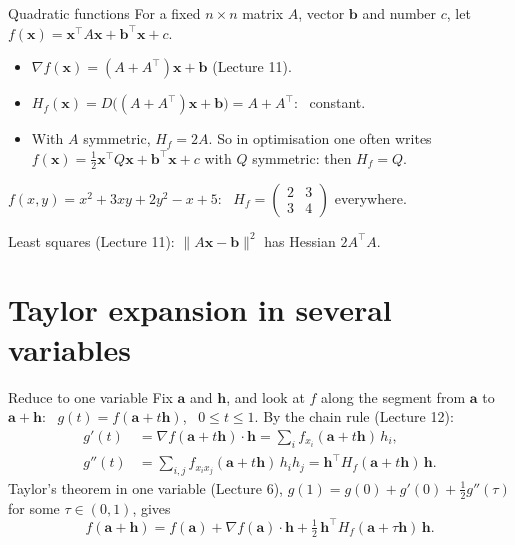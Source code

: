 \documentclass[10pt]{wosm-slides}
\newcommand{\norm}[1]{\lVert #1 \rVert}
\newcommand{\vx}{\mathbf{x}}
\newcommand{\va}{\mathbf{a}}
\newcommand{\vb}{\mathbf{b}}
\newcommand{\vh}{\mathbf{h}}
\begin{document}
\begin{frame}{Quadratic functions}
  For a fixed $n \times n$ matrix $A$, vector $\vb$ and number $c$, let
  $f(\vx) = \vx^\top A \vx + \vb^\top \vx + c$.
  \pause
  \begin{itemize}
    \item $\nabla f(\vx) = (A + A^\top)\vx + \vb$ \quad (Lecture 11).
    \item $H_f(\vx) = D\bigl((A + A^\top)\vx + \vb\bigr) = A + A^\top$: \ constant.
    \item With $A$ symmetric, $H_f = 2A$. So in optimisation one often writes
      $f(\vx) = \frac12 \vx^\top Q \vx + \vb^\top \vx + c$ with $Q$ symmetric: then $H_f = Q$.
  \end{itemize}
  \pause
  \begin{example}
    $f(x, y) = x^2 + 3xy + 2y^2 - x + 5$: \
    $H_f = \begin{pmatrix} 2 & 3 \\ 3 & 4 \end{pmatrix}$ everywhere.
  \end{example}
  {\small Least squares (Lecture 11): $\norm{A\vx - \vb}^2$ has Hessian $2A^\top A$.\par}
\end{frame}

\section{Taylor expansion in several variables}

\begin{frame}{Reduce to one variable}
  Fix $\va$ and $\vh$, and look at $f$ along the segment from $\va$ to $\va + \vh$:
  \ $g(t) = f(\va + t\vh)$, \ $0 \le t \le 1$.
  \pause
  By the chain rule (Lecture 12):
  \begin{align*}
    g'(t) &= \nabla f(\va + t\vh) \cdot \vh = \sum_i f_{x_i}(\va + t\vh)\, h_i, \\
    g''(t) &= \sum_{i,j} f_{x_i x_j}(\va + t\vh)\, h_i h_j = \vh^\top H_f(\va + t\vh)\, \vh .
  \end{align*}
  \pause
  Taylor's theorem in one variable (Lecture 6), $g(1) = g(0) + g'(0) + \frac12 g''(\tau)$ for some
  $\tau \in (0, 1)$, gives
  \[ f(\va + \vh) = f(\va) + \nabla f(\va) \cdot \vh + \tfrac12\, \vh^\top H_f(\va + \tau\vh)\, \vh . \]
\end{frame}
\end{document}
